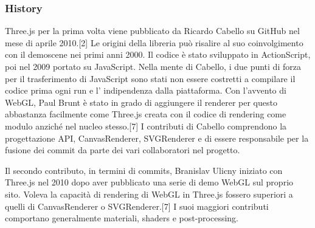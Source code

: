 
\subsubsection{History}
Three.js per la prima volta viene pubblicato da Ricardo Cabello su GitHub nel mese di aprile 2010.[2]
Le origini della libreria pu\`o risalire al suo coinvolgimento con il demoscene nei primi anni 2000.
Il codice \`e stato sviluppato in ActionScript, poi nel 2009 portato su JavaScript. Nella mente di Cabello,
i due punti di forza per il trasferimento di JavaScript sono stati non essere costretti a compilare il codice prima
ogni run e l' indipendenza dalla piattaforma. Con l'avvento di WebGL, Paul Brunt è stato in grado di aggiungere il renderer
per questo abbastanza facilmente come Three.js creata con il codice di rendering come modulo anziché nel
nucleo stesso.[7] I contributi di Cabello comprendono la progettazione API, CanvasRenderer, SVGRenderer e di essere
responsabile per la fusione dei commit da parte dei vari collaboratori nel progetto.


Il secondo contributo, in termini di commits, Branislav Ulicny iniziato con Three.js nel 2010 dopo aver
pubblicato una serie di demo WebGL sul proprio sito. Voleva la capacit\`a di rendering di WebGL in Three.js
fossero superiori a quelli di CanvasRenderer o SVGRenderer.[7]
I suoi maggiori contributi comportano generalmente materiali, shaders e post-processing.

